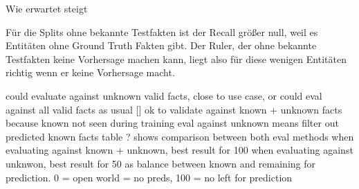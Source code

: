 Wie erwartet steigt

Für die Splits ohne bekannte Testfakten ist der Recall größer null, weil es Entitäten ohne Ground Truth Fakten gibt. Der Ruler, der ohne bekannte Testfakten keine Vorhersage machen kann, liegt also für diese wenigen Entitäten richtig wenn er keine Vorhersage macht.

could evaluate against unknown valid facts, close to use case, or could eval against all valid facts as usual []
ok to validate against known + unknown facts because known not seen during training
eval against unknown means filter out predicted known facts
table ? shows comparison between both eval methods
when evaluating against known + unknown, best result for 100
when evaluating against unknwon, best result for 50 as balance between known and remaining for prediction. 0 = open world = no preds, 100 = no left for prediction

